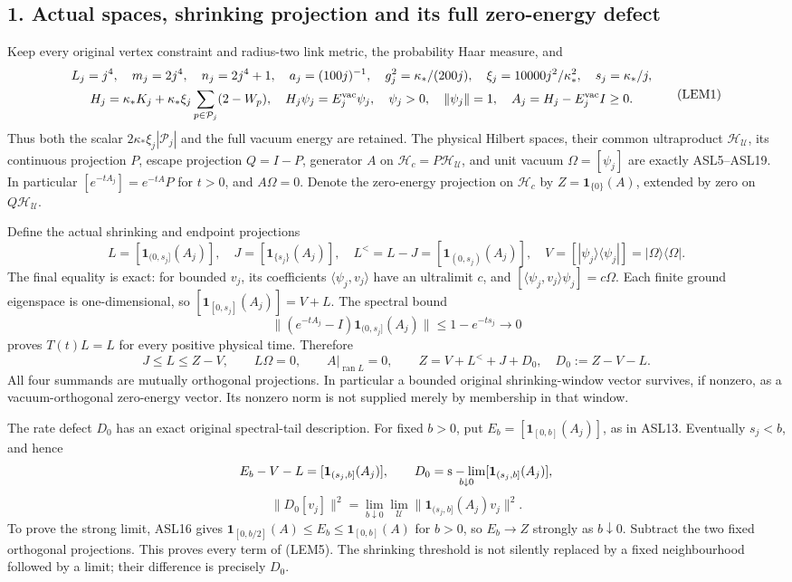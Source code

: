 \documentclass[11pt]{article}
\begin{document}
\subsection*{1. Actual spaces, shrinking projection and its full zero-energy defect}

Keep every original vertex constraint and radius-two link metric, the probability Haar measure, and
\[
\begin{gathered}
 L_j=j^4,\quad m_j=2j^4,\quad n_j=2j^4+1,\quad
 a_j=(100j)^{-1},\quad g_j^2=\kappa_*/(200j),\quad
 \xi_j=10000j^2/\kappa_*^2,\quad s_j=\kappa_*/j,\\
 H_j=\kappa_*K_j+\kappa_*\xi_j\sum_{p\in\mathcal P_j}(2-W_p),\quad
 H_j\psi_j=E_j^{\rm vac}\psi_j,\quad\psi_j>0,\quad\|\psi_j\|=1,\quad
 A_j=H_j-E_j^{\rm vac}I\ge0.
\end{gathered}\tag{LEM1}
\]
Thus both the scalar \(2\kappa_*\xi_j|\mathcal P_j|\) and the full vacuum energy are retained. The physical Hilbert spaces, their common ultraproduct \(\mathcal H_{\mathcal U}\), its continuous projection \(P\), escape projection \(Q=I-P\), generator \(A\) on \(\mathcal H_c=P\mathcal H_{\mathcal U}\), and unit vacuum \(\Omega=[\psi_j]\) are exactly ASL5–ASL19. In particular \([e^{-tA_j}]=e^{-tA}P\) for \(t>0\), and \(A\Omega=0\). Denote the zero-energy projection on \(\mathcal H_c\) by \(Z=\mathbf1_{\{0\}}(A)\), extended by zero on \(Q\mathcal H_{\mathcal U}\).

Define the actual shrinking and endpoint projections
\[
 L=[\mathbf1_{(0,s_j]}(A_j)],\quad
 J=[\mathbf1_{\{s_j\}}(A_j)],\quad
 L^{<}=L-J=[\mathbf1_{(0,s_j)}(A_j)],\quad
 V=[|\psi_j\rangle\langle\psi_j|]=|\Omega\rangle\langle\Omega|.
 \tag{LEM2}
\]
The final equality is exact: for bounded \(v_j\), its coefficients \(\langle\psi_j,v_j\rangle\) have an ultralimit \(c\), and \([\langle\psi_j,v_j\rangle\psi_j]=c\Omega\). Each finite ground eigenspace is one-dimensional, so \([\mathbf1_{[0,s_j]}(A_j)]=V+L\). The spectral bound
\[
 \|(e^{-tA_j}-I)\mathbf1_{(0,s_j]}(A_j)\|
 \le1-e^{-ts_j}\longrightarrow0
 \tag{LEM3}
\]
proves \(T(t)L=L\) for every positive physical time. Therefore
\[
 J\le L\le Z-V,\qquad L\Omega=0,\qquad
 A|_{\operatorname{ran}L}=0,
 \qquad Z=V+L^{<}+J+D_0,
 \quad D_0:=Z-V-L.
 \tag{LEM4}
\]
All four summands are mutually orthogonal projections. In particular a bounded original shrinking-window vector survives, if nonzero, as a vacuum-orthogonal zero-energy vector. Its nonzero norm is not supplied merely by membership in that window.

The rate defect \(D_0\) has an exact original spectral-tail description. For fixed \(b>0\), put \(E_b=[\mathbf1_{[0,b]}(A_j)]\), as in ASL13. Eventually \(s_j<b\), and hence
\[
 E_b-V-L=[\mathbf1_{(s_j,b]}(A_j)],\qquad
 D_0=\mathop{\rm s-lim}_{b\downarrow0}[\mathbf1_{(s_j,b]}(A_j)],
\]
\[
 \|D_0[v_j]\|^2
 =\lim_{b\downarrow0}\lim_{\mathcal U}
       \|\mathbf1_{(s_j,b]}(A_j)v_j\|^2.
 \tag{LEM5}
\]
To prove the strong limit, ASL16 gives \(\mathbf1_{[0,b/2]}(A)\le E_b\le\mathbf1_{[0,b]}(A)\) for \(b>0\), so \(E_b\to Z\) strongly as \(b\downarrow0\). Subtract the two fixed orthogonal projections. This proves every term of (LEM5). The shrinking threshold is not silently replaced by a fixed neighbourhood followed by a limit; their difference is precisely \(D_0\).
\end{document}
